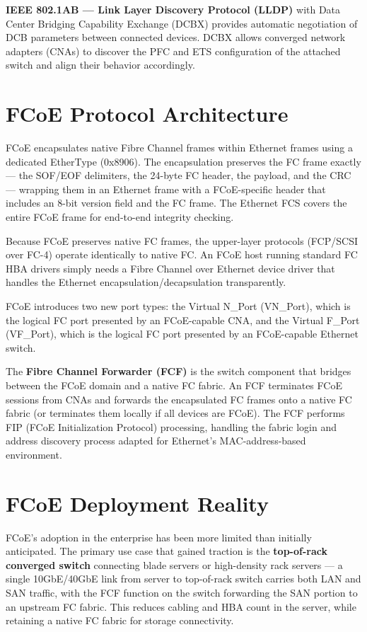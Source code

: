 \textbf{IEEE 802.1AB --- Link Layer Discovery Protocol (LLDP)} with Data Center Bridging Capability Exchange (DCBX) provides automatic negotiation of DCB parameters between connected devices. DCBX allows converged network adapters (CNAs) to discover the PFC and ETS configuration of the attached switch and align their behavior accordingly.

\section{FCoE Protocol Architecture}
FCoE encapsulates native Fibre Channel frames within Ethernet frames using a dedicated EtherType (0x8906). The encapsulation preserves the FC frame exactly --- the SOF/EOF delimiters, the 24-byte FC header, the payload, and the CRC --- wrapping them in an Ethernet frame with a FCoE-specific header that includes an 8-bit version field and the FC frame. The Ethernet FCS covers the entire FCoE frame for end-to-end integrity checking.

Because FCoE preserves native FC frames, the upper-layer protocols (FCP/SCSI over FC-4) operate identically to native FC. An FCoE host running standard FC HBA drivers simply needs a Fibre Channel over Ethernet device driver that handles the Ethernet encapsulation/decapsulation transparently.

FCoE introduces two new port types: the Virtual N\_Port (VN\_Port), which is the logical FC port presented by an FCoE-capable CNA, and the Virtual F\_Port (VF\_Port), which is the logical FC port presented by an FCoE-capable Ethernet switch.

The \textbf{Fibre Channel Forwarder (FCF)} is the switch component that bridges between the FCoE domain and a native FC fabric. An FCF terminates FCoE sessions from CNAs and forwards the encapsulated FC frames onto a native FC fabric (or terminates them locally if all devices are FCoE). The FCF performs FIP (FCoE Initialization Protocol) processing, handling the fabric login and address discovery process adapted for Ethernet's MAC-address-based environment.

\section{FCoE Deployment Reality}
FCoE's adoption in the enterprise has been more limited than initially anticipated. The primary use case that gained traction is the \textbf{top-of-rack converged switch} connecting blade servers or high-density rack servers --- a single 10GbE/40GbE link from server to top-of-rack switch carries both LAN and SAN traffic, with the FCF function on the switch forwarding the SAN portion to an upstream FC fabric. This reduces cabling and HBA count in the server, while retaining a native FC fabric for storage connectivity.

